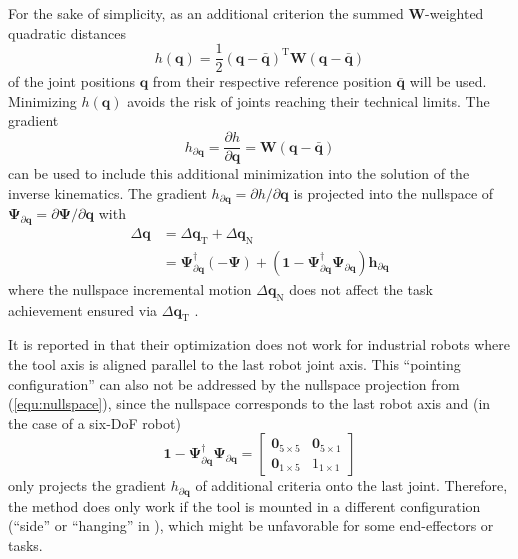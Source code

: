 \documentclass{svproc}
\newcommand{\bm}[1]{\boldsymbol{#1}}
\newcommand{\transp}[0]{{\mathrm{T}}}
\begin{document}
For the sake of simplicity, as an additional criterion the summed $\bm{W}$-weighted quadratic distances
%
\begin{equation}
h(\bm{q})
=
\frac{1}{2} (\bm{q}-\bar{\bm{q}})^\transp\bm{W}(\bm{q}-\bar{\bm{q}})
\end{equation}  
%
of the joint positions $\bm{q}$ from their respective reference position $\bar{\bm{q}}$ will be used.
Minimizing $h(\bm{q})$ avoids the risk of joints reaching their technical limits.
The gradient
%
\begin{equation}
h_{\partial\bm{q}}
=
\frac{\partial h}{\partial \bm{q}}
=
\bm{W}(\bm{q}-\bar{\bm{q}})
\end{equation}
%
can be used to include this additional minimization into the solution of the inverse kinematics.
The gradient $h_{\partial\bm{q}}=\partial h/\partial \bm{q}$ is projected into the nullspace of $\bm{\Psi}_{\partial\bm{q}}=\partial \bm{\Psi}/\partial \bm{q}$ with
%
\begin{align}
{\Delta}\bm{q}
&=
{\Delta}\bm{q}_{\mathrm{T}} + {\Delta}\bm{q}_{\mathrm{N}} \nonumber \\
&=
\bm{\Psi}_{\partial\bm{q}}^{\dagger} (-\bm{\Psi}) +  (\bm{1}-\bm{\Psi}_{\partial\bm{q}}^{\dagger}\bm{\Psi}_{\partial\bm{q}}) \bm{h}_{\partial\bm{q}}
\label{equ:nullspace}
\end{align}
%
where the nullspace incremental motion ${\Delta}\bm{q}_{\mathrm{N}}$ does not affect the task achievement ensured via ${\Delta}\bm{q}_{\mathrm{T}}$ \cite{Yoshikawa1984}.

It is reported in \cite{GuoDonKe2015} that their optimization does not work for industrial robots where the tool axis is aligned parallel to the last robot joint axis.
This ``pointing configuration'' can also not be addressed by the nullspace projection from (\ref{equ:nullspace}), since the nullspace corresponds to the last robot axis and (in the case of a six-DoF robot)
%
\begin{equation}
\bm{1}-\bm{\Psi}_{\partial\bm{q}}^{\dagger}\bm{\Psi}_{\partial\bm{q}}
=
\begin{bmatrix}
\bm{0}_{5 \times 5} & \bm{0}_{5 \times 1} \\
\bm{0}_{1 \times 5} & 1_{1 \times 1}
\end{bmatrix}
\end{equation}
%
only projects the gradient $h_{\partial\bm{q}}$ of additional criteria onto the last joint.
Therefore, the method does only work if the tool is mounted in a different configuration (``side'' or ``hanging'' in \cite{GuoDonKe2015}), which might be unfavorable for some end-effectors or tasks.
\end{document}
